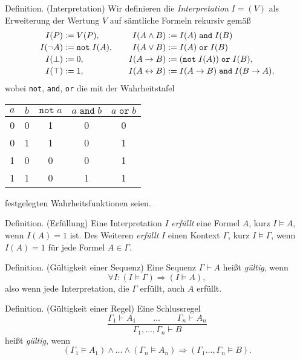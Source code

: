 \documentclass[8pt]{beamer}
\newcommand{\cond}{\rightarrow}
\newcommand{\bicond}{\leftrightarrow}
\begin{document}
\begin{frame}
\begin{block}{Definition. (Interpretation)}
Wir definieren die \emph{Interpretation} $I = (V)$ als Erweiterung der
Wertung $V$ auf sämtliche Formeln rekursiv gemäß
\[\begin{array}{@{}r@{}l@{\qquad}r@{}l@{}}
I(P) &{}:= V(P), & I(A\land B) &{}:= I(A)\;\texttt{and}\; I(B)\\[2pt]
I(\lnot A) &{}:= \texttt{not}\; I(A), & I(A\lor B) &{}:= I(A)\;\texttt{or}\; I(B)\\[2pt]
I(\bot) &{}:= 0, & I(A\cond B) &{}:= (\texttt{not}\; I(A))\;\texttt{or}\; I(B),\\[2pt]
I(\top) &{}:= 1, & I(A\bicond B) &{}:=  I(A\cond B)\;\texttt{and}\; I(B\cond A),
\end{array}\]
wobei \texttt{not}, \texttt{and}, \texttt{or}
die mit der Wahrheitstafel
\begin{center}
\begin{tabular}{ccccc}
\toprule
$a$ & $b$ & $\texttt{not}\;a$ & $a\;\texttt{and}\;b$ & $a\;\texttt{or}\;b$\\
\midrule[\heavyrulewidth]
0 & 0 & 1 & 0 & 0 \\
0 & 1 & 1 & 0 & 1 \\
1 & 0 & 0 & 0 & 1 \\
1 & 1 & 0 & 1 & 1 \\
\bottomrule
\end{tabular}
\end{center}
festgelegten Wahrheitsfunktionen seien.
\end{block}
\end{frame}

\begin{frame}
\begin{block}{Definition. (Erfüllung)}
Eine Interpretation $I$ \emph{erfüllt} eine Formel $A$, kurz
$I\models A$, wenn $I(A)=1$ ist. Des Weiteren \emph{erfüllt} $I$ einen
Kontext $\Gamma$, kurz $I\models\Gamma$, wenn $I(A)=1$ für jede Formel
$A\in\Gamma$.
\end{block}\pause

\begin{block}{Definition. (Gültigkeit einer Sequenz)}
Eine Sequenz $\Gamma\vdash A$ heißt \emph{gültig}, wenn
\[\forall I\colon (I\models\Gamma)\Rightarrow (I\models A),\]
also wenn jede Interpretation, die $\Gamma$ erfüllt, auch $A$ erfüllt.
\end{block}\pause

\begin{block}{Definition. (Gültigkeit einer Regel)}
Eine Schlussregel
\[\dfrac{\Gamma_1\vdash A_1\qquad\ldots\qquad\Gamma_n\vdash A_n}{\Gamma_1,\ldots,\Gamma_n\vdash B}\]
heißt \emph{gültig}, wenn
\[(\Gamma_1\models A_1)\land\ldots\land (\Gamma_n\models A_n)\Rightarrow (\Gamma_1\ldots,\Gamma_n\models B).\]
\end{block}
\end{frame}
\end{document}
